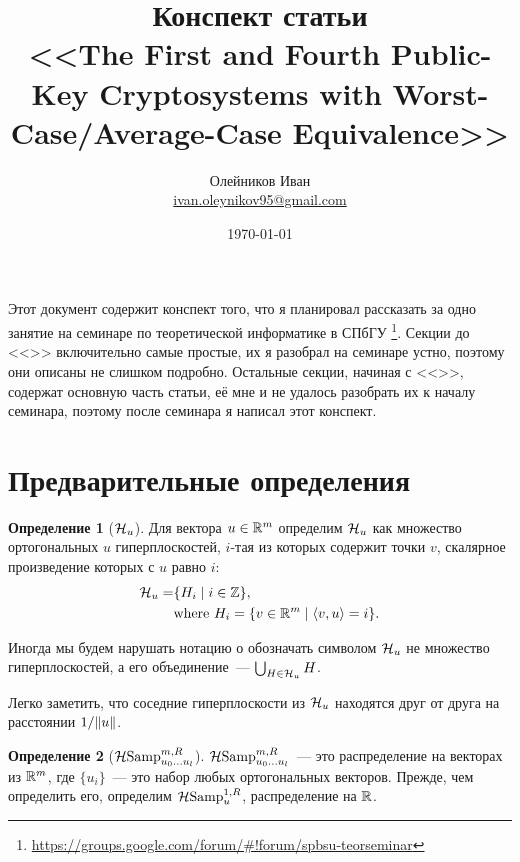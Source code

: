 \documentclass[oneside, a4paper]{article}
\theoremstyle{plain}
\theoremstyle{definition}
\newtheorem{defn}{Определение}
\theoremstyle{remark}
\newcommand\R{\ensuremath \mathbb R}
\newcommand\Z{\ensuremath \mathbb Z}
\newcommand\HS{\ensuremath \operatorname{\mathcal H Samp}}
\newcommand\HH{\ensuremath \operatorname{\mathcal H}}
\DeclarePairedDelimiter\norm{\lVert}{\rVert}
\DeclarePairedDelimiter\ang{\langle}{\rangle}
\begin{document}
\title{Конспект статьи \\ \foreignlanguage{english}{<<The First and Fourth Public-Key Cryptosystems
with Worst-Case/Average-Case Equivalence>>  \cite{ajtaidwork}}}
\author{Олейников Иван \\ \url{ivan.oleynikov95@gmail.com}}
\date{\today}
\maketitle

Этот документ содержит конспект того, что я планировал рассказать за одно занятие на семинаре по теоретической
информатике в СПбГУ \footnote{\url{https://groups.google.com/forum/\#!forum/spbsu-teorseminar}}. Секции до
<<>> включительно самые простые, их я разобрал на семинаре устно, поэтому они описаны не слишком
подробно. Остальные секции, начиная с <<>>, содержат основную часть статьи, её мне и не
удалось разобрать их к началу семинара, поэтому после семинара я написал этот конспект.

\tableofcontents

\section{Предварительные определения}

\begin{defn}[$\HH_u$]
Для вектора $u \in \R^m$ определим $\HH_u$ как множество ортогональных $u$ гиперплоскостей, $i$-тая из которых содержит
точки $v$, скалярное произведение которых с $u$ равно $i$:
\[
\begin{aligned}
\HH_u = &\{H_i \mid i \in \Z \}, \\
&\text{where } H_i = \{v \in \R^m \mid \ang{v, u} = i\}.
\end{aligned}
\]

Иногда мы будем нарушать нотацию о обозначать символом $\HH_u$ не множество гиперплоскостей, а его объединение~---
$\bigcup_{H \in \HH_u} H$.
\end{defn}

Легко заметить, что соседние гиперплоскости из $\HH_u$ находятся друг от друга на расстоянии $1/\norm{u}$.

\begin{defn}[$\HS^{m, R}_{u_0 \dots u_l}$]
$\HS^{m, R}_{u_0 \dots u_l}$~--- это распределение на векторах из $\R^m$, где $\{u_i\}$~--- это набор любых
ортогональных векторов. Прежде, чем определить его, определим $\HS^{1, R}_{u}$, распределение на $\R$.
\end{defn}
\end{document}
